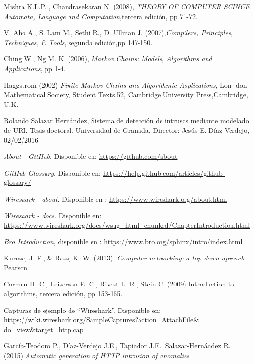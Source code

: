 \begin{thebibliography}{99}
Mishra K.L.P. , Chandrasekaran N. (2008), \textit{THEORY OF COMPUTER SCINCE Automata, Language and Computation},tercera edición, pp 71-72.

V. Aho A., S. Lam M., Sethi R., D. Ullman J. (2007),\textit{Compilers, Principles, Techniques, \& Tools}, segunda edición,pp 147-150.

Ching W., Ng M. K. (2006), \textit{Markov Chains: Models, Algorithms and Applications}, pp 1-4.

Haggstrom (2002) \textit{Finite Markov Chains and Algorithmic Applications}, Lon-
don Mathematical Society, Student Texts 52, Cambridge University Press,Cambridge, U.K.

Rolando Salazar Hernández, Sistema de detección de intrusos mediante modelado de URI. Tesis doctoral. Universidad de Granada. Director: Jesús E. Díaz Verdejo, 02/02/2016

 \textit{About - GitHub}. Disponible en: \url{https://github.com/about}

 \textit{GitHub Glossary}. Disponible en: \url{https://help.github.com/articles/github-glossary/}

 \textit{Wireshark - about}. Disponible en : \url{https://www.wireshark.org/about.html}

 \textit{Wireshark - docs}. Disponible en: \url{https://www.wireshark.org/docs/wsug_html_chunked/ChapterIntroduction.html}

\textit{Bro Introduction}, disponible en : \url{https://www.bro.org/sphinx/intro/index.html}

Kurose, J. F., \& Ross, K. W. (2013). \textit{Computer networking: a top-down aproach}. Pearson

 Cormen H. C., Leiserson E. C., Rivest L. R., Stein C. (2009).Introduction to algorithms, tercera edición, pp 153-155.

 Capturas de ejemplo de “Wireshark”. Disponible en:  \url{https://wiki.wireshark.org/SampleCaptures?action=AttachFile&
do=view&target=http.cap}

 García-Teodoro P., Díaz-Verdejo J.E., Tapiador J.E., Salazar-Hernández R. (2015) \textit{Automatic generation of HTTP intrusion of anomalies}

\end{thebibliography}